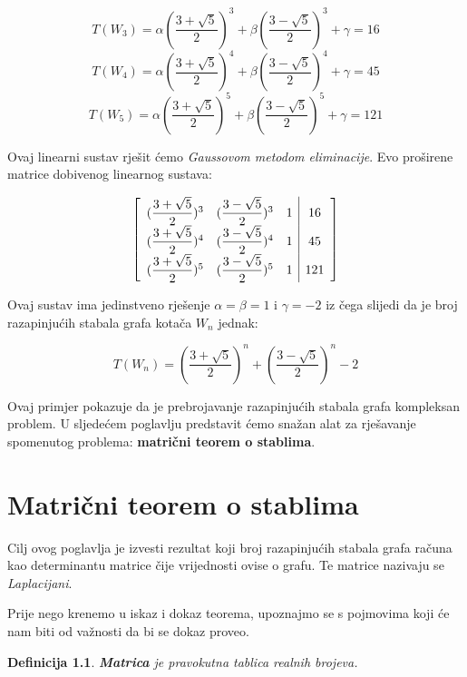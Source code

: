 \documentclass[times, utf8, zavrsni]{fer}
\newtheorem{definition}{Definicija}[chapter]
\begin{document}
\[T(W_3) = \alpha(\dfrac{3 + \sqrt{5}}{2})^3 + \beta(\dfrac{3 - \sqrt{5}}{2})^3 + \gamma = 16\]
\[T(W_4) = \alpha(\dfrac{3 + \sqrt{5}}{2})^4 + \beta(\dfrac{3 - \sqrt{5}}{2})^4 + \gamma = 45\]
\[T(W_5) = \alpha(\dfrac{3 + \sqrt{5}}{2})^5 + \beta(\dfrac{3 - \sqrt{5}}{2})^5 + \gamma = 121\]

Ovaj linearni sustav rješit ćemo \textit{Gaussovom metodom eliminacije}. Evo proširene matrice dobivenog linearnog sustava:

\[
\centering 
\begin{bmatrix}
	\begin{array}{ccc|c}
		(\dfrac{3 + \sqrt{5}}{2})^3 & (\dfrac{3 - \sqrt{5}}{2})^3 & 1 & 16 \\
		(\dfrac{3 + \sqrt{5}}{2})^4 & (\dfrac{3 - \sqrt{5}}{2})^4 & 1 & 45 \\
		(\dfrac{3 + \sqrt{5}}{2})^5 & (\dfrac{3 - \sqrt{5}}{2})^5 & 1 & 121 \\
	\end{array}
\end{bmatrix}
\]

Ovaj sustav ima jedinstveno rješenje $\alpha = \beta = 1$ i $\gamma = -2$ iz čega slijedi da je broj razapinjućih stabala grafa kotača $W_n$ jednak:

\begin{equation}
T(W_n) = (\dfrac{3 + \sqrt{5}}{2})^n + (\dfrac{3 - \sqrt{5}}{2})^n - 2
\end{equation}

Ovaj primjer pokazuje da je prebrojavanje razapinjućih stabala grafa kompleksan problem. U sljedećem poglavlju predstavit ćemo snažan alat za rješavanje spomenutog problema: \textbf{matrični teorem o stablima}.

\chapter{Matrični teorem o stablima}

Cilj ovog poglavlja je izvesti rezultat koji broj razapinjućih stabala grafa računa kao determinantu matrice čije vrijednosti ovise o grafu. Te matrice nazivaju se \textit{Laplacijani}.

Prije nego krenemo u iskaz i dokaz teorema, upoznajmo se s pojmovima koji će nam biti od važnosti da bi se dokaz proveo.

\begin{definition}
	\textbf{Matrica} je pravokutna tablica realnih brojeva.
\end{definition}
\end{document}

